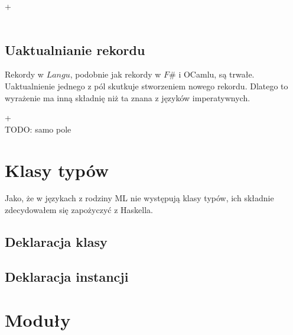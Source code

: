 \documentclass[declaration,shortabstract]{iithesis}
\begin{document}
\begin{bnf*}
  {   \bnfts{=}  
    +  
  }\\
  {  \bnfts{ = } 
     \bnfor {} \bnfts{ = } 
    \bnfts{ ; }
  }\\
\end{bnf*}

\subsection{Uaktualnianie rekordu}

Rekordy w $Langu$, podobnie jak rekordy w $F\#$ i OCamlu, są trwałe. 
Uaktualnienie jednego z pól skutkuje stworzeniem nowego rekordu. Dlatego to
wyrażenie ma inną składnię niż ta znana z języków imperatywnych.

\begin{bnf*}
  { \bnfts{ \{ }   
    + \bnfts{ \} } 
  }\\
  {  \bnfts{=} 
     \bnfor {} \bnfts{=} 
    \bnfts{;}
    TODO: samo pole 
  }\\
\end{bnf*}

\section{Klasy typów}

Jako, że w językach z rodziny ML nie występują klasy typów, ich składnie 
zdecydowałem się zapożyczyć z Haskella.

\subsection{Deklaracja klasy}

\subsection{Deklaracja instancji}

\section{Moduły}
\end{document}
